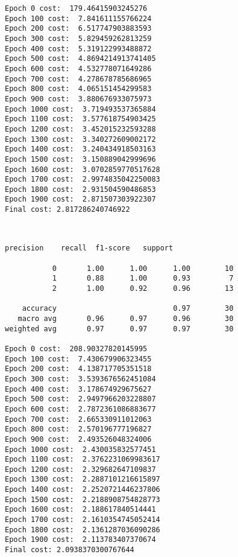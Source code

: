 \documentclass[11pt]{article}
\begin{document}
    \begin{Verbatim}[commandchars=\\\{\}]
Epoch 0 cost:  179.46415903245276
Epoch 100 cost:  7.841611155766224
Epoch 200 cost:  6.517747903883593
Epoch 300 cost:  5.829459262813259
Epoch 400 cost:  5.319122993488872
Epoch 500 cost:  4.8694214913741405
Epoch 600 cost:  4.532778071649286
Epoch 700 cost:  4.278678785686965
Epoch 800 cost:  4.065151454299583
Epoch 900 cost:  3.880676933075973
Epoch 1000 cost:  3.719493537365884
Epoch 1100 cost:  3.577618754903425
Epoch 1200 cost:  3.452015232593288
Epoch 1300 cost:  3.340272609002172
Epoch 1400 cost:  3.240434918503163
Epoch 1500 cost:  3.150889042999696
Epoch 1600 cost:  3.0702859770517628
Epoch 1700 cost:  2.9974835042250083
Epoch 1800 cost:  2.931504590486853
Epoch 1900 cost:  2.871507303922307
Final cost: 2.817286240746922

    \end{Verbatim}

    \begin{center}
    \end{center}
    { \hspace*{\fill} \\}
    
    \begin{Verbatim}[commandchars=\\\{\}]
              precision    recall  f1-score   support

           0       1.00      1.00      1.00        10
           1       0.88      1.00      0.93         7
           2       1.00      0.92      0.96        13

    accuracy                           0.97        30
   macro avg       0.96      0.97      0.96        30
weighted avg       0.97      0.97      0.97        30

Epoch 0 cost:  208.90327820145995
Epoch 100 cost:  7.430679906323455
Epoch 200 cost:  4.138717705351518
Epoch 300 cost:  3.5393676562451084
Epoch 400 cost:  3.178674929675627
Epoch 500 cost:  2.9497966203228807
Epoch 600 cost:  2.7872361086883677
Epoch 700 cost:  2.665330911012063
Epoch 800 cost:  2.570196777196827
Epoch 900 cost:  2.493526048324006
Epoch 1000 cost:  2.430035832577451
Epoch 1100 cost:  2.3762231069983617
Epoch 1200 cost:  2.329682647109837
Epoch 1300 cost:  2.2887101216615897
Epoch 1400 cost:  2.2520721446237806
Epoch 1500 cost:  2.2188908754828773
Epoch 1600 cost:  2.188617840514441
Epoch 1700 cost:  2.1610354745052414
Epoch 1800 cost:  2.1361287036090286
Epoch 1900 cost:  2.113783407370674
Final cost: 2.0938370300767644

    \end{Verbatim}
\end{document}
